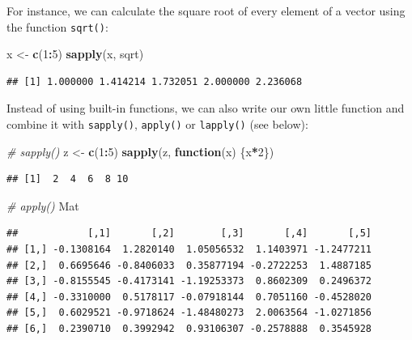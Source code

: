 \documentclass[
]{book}
\newenvironment{Shaded}{\begin{snugshade}}{\end{snugshade}}
\newcommand{\CommentTok}[1]{\textcolor[rgb]{0.56,0.35,0.01}{\textit{#1}}}
\newcommand{\ControlFlowTok}[1]{\textcolor[rgb]{0.13,0.29,0.53}{\textbf{#1}}}
\newcommand{\DecValTok}[1]{\textcolor[rgb]{0.00,0.00,0.81}{#1}}
\newcommand{\FunctionTok}[1]{\textcolor[rgb]{0.13,0.29,0.53}{\textbf{#1}}}
\newcommand{\NormalTok}[1]{#1}
\newcommand{\OtherTok}[1]{\textcolor[rgb]{0.56,0.35,0.01}{#1}}
\newcommand{\SpecialCharTok}[1]{\textcolor[rgb]{0.81,0.36,0.00}{\textbf{#1}}}
\begin{document}
For instance, we can calculate the square root of every element of a vector using the function \texttt{sqrt()}:

\begin{Shaded}
\begin{Highlighting}[]
\NormalTok{x }\OtherTok{\textless{}{-}} \FunctionTok{c}\NormalTok{(}\DecValTok{1}\SpecialCharTok{:}\DecValTok{5}\NormalTok{)}
\FunctionTok{sapply}\NormalTok{(x, sqrt)}
\end{Highlighting}
\end{Shaded}

\begin{verbatim}
## [1] 1.000000 1.414214 1.732051 2.000000 2.236068
\end{verbatim}

Instead of using built-in functions, we can also write our own little function and combine it with \texttt{sapply()}, \texttt{apply()} or \texttt{lapply()} (see below):

\begin{Shaded}
\begin{Highlighting}[]
\CommentTok{\# sapply()}
\NormalTok{z }\OtherTok{\textless{}{-}} \FunctionTok{c}\NormalTok{(}\DecValTok{1}\SpecialCharTok{:}\DecValTok{5}\NormalTok{)}
\FunctionTok{sapply}\NormalTok{(z, }\ControlFlowTok{function}\NormalTok{(x) \{x}\SpecialCharTok{*}\DecValTok{2}\NormalTok{\}) }
\end{Highlighting}
\end{Shaded}

\begin{verbatim}
## [1]  2  4  6  8 10
\end{verbatim}

\begin{Shaded}
\begin{Highlighting}[]
\CommentTok{\# apply()}
\NormalTok{Mat }
\end{Highlighting}
\end{Shaded}

\begin{verbatim}
##            [,1]       [,2]        [,3]       [,4]       [,5]
## [1,] -0.1308164  1.2820140  1.05056532  1.1403971 -1.2477211
## [2,]  0.6695646 -0.8406033  0.35877194 -0.2722253  1.4887185
## [3,] -0.8155545 -0.4173141 -1.19253373  0.8602309  0.2496372
## [4,] -0.3310000  0.5178117 -0.07918144  0.7051160 -0.4528020
## [5,]  0.6029521 -0.9718624 -1.48480273  2.0063564 -1.0271856
## [6,]  0.2390710  0.3992942  0.93106307 -0.2578888  0.3545928
\end{verbatim}
\end{document}
